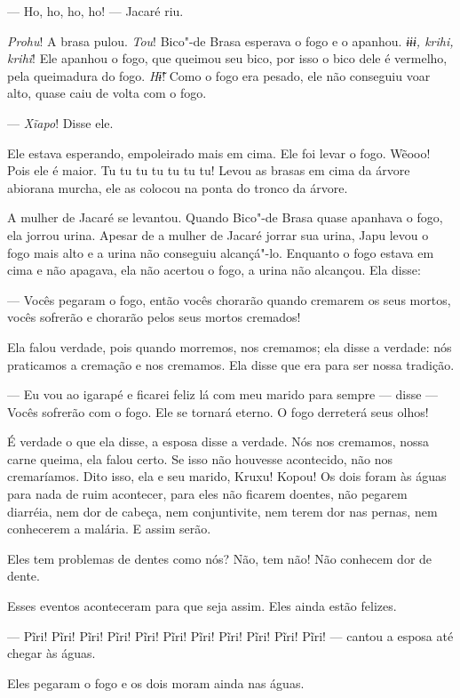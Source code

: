 --- Ho, ho, ho, ho! --- Jacaré riu. 

\emph{Prohu}! A brasa pulou. \emph{Tou}! Bico"-de Brasa esperava o fogo e
o apanhou. \emph{ɨɨɨ, krihi, krihi}! Ele apanhou o fogo, que queimou seu
bico, por isso o bico dele é vermelho, pela queimadura do
fogo. \emph{Hɨ̃}! Como o fogo era pesado, ele não conseguiu voar alto,
quase caiu de volta com o fogo. 

--- \emph{Xĩapo}! Disse ele.

Ele estava esperando, empoleirado mais em cima. Ele foi levar o fogo.
Wẽooo! Pois ele é maior. Tu tu tu tu tu tu tu! Levou as brasas em cima
da árvore abiorana murcha, ele as colocou na ponta do tronco da árvore. 

A mulher de Jacaré se levantou. Quando Bico"-de Brasa quase apanhava o
fogo, ela jorrou urina. Apesar de a mulher de Jacaré jorrar sua urina,
Japu levou o fogo mais alto e a urina não conseguiu alcançá"-lo. Enquanto
o fogo estava em cima e não apagava, ela não acertou o fogo, a urina não
alcançou. Ela disse:

--- Vocês pegaram o fogo, então vocês chorarão quando cremarem os seus
mortos, vocês sofrerão e chorarão pelos seus mortos cremados! 

Ela falou verdade, pois quando morremos, nos cremamos; ela disse a
verdade: nós praticamos a cremação e nos cremamos. Ela disse que era
para ser nossa tradição. 

--- Eu vou ao igarapé e ficarei feliz lá com meu marido para sempre ---
disse --- Vocês sofrerão com o fogo. Ele se tornará eterno. O fogo
derreterá seus olhos! 

É verdade o que ela disse, a esposa disse a verdade. Nós nos cremamos,
nossa carne queima, ela falou certo. Se isso não houvesse acontecido,
não nos cremaríamos. Dito isso, ela e seu marido, Kruxu! Kopou! Os dois
foram às águas para nada de ruim acontecer, para eles não ficarem
doentes, não pegarem diarréia, nem dor de cabeça, nem conjuntivite, nem
terem dor nas pernas, nem conhecerem a malária. E assim serão. 

Eles tem problemas de dentes como nós? Não, tem não! Não conhecem dor de
dente. 

Esses eventos aconteceram para que seja assim. Eles ainda estão
felizes. 

--- Pĩri! Pĩri! Pĩri! Pĩri! Pĩri! Pĩri! Pĩri! Pĩri! Pĩri! Pĩri! Pĩri!
--- cantou a esposa até chegar às águas. 

 Eles pegaram o fogo e os dois moram ainda nas águas.

